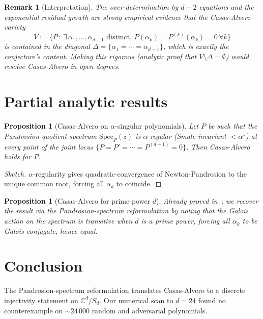 \documentclass[11pt,a4paper]{article}
\newtheorem{proposition}[theorem]{Proposition}
\newtheorem{remark}[theorem]{Remark}
\begin{document}
\begin{remark}[Interpretation]
The over-determination by $d - 2$ equations and the exponential residual growth
are strong empirical evidence that the Casas-Alvero variety
\[
V := \{P \,:\, \exists\, \alpha_1, \ldots, \alpha_{d-1} \text{ distinct},
\,P(\alpha_k) = P^{(k)}(\alpha_k) = 0\,\forall k\}
\]
is contained in the diagonal $\Delta = \{\alpha_1 = \cdots = \alpha_{d-1}\}$,
which is exactly the conjecture's content. Making this rigorous (analytic proof
that $V \setminus \Delta = \emptyset$) would resolve Casas-Alvero
in open degrees.
\end{remark}

\section{Partial analytic results}\label{sec:partial}

\begin{proposition}[Casas-Alvero on $\alpha$-singular polynomials]\label{prop:CA-alpha}
Let $P$ be such that the Pandrosion-quotient spectrum $\mathrm{Spec}_P(z)$ is $\alpha$-regular (Smale invariant $< \alpha^\star$) at every point of the joint locus $\{P = P' = \cdots = P^{(d-1)} = 0\}$. Then Casas-Alvero holds for $P$.
\end{proposition}

\begin{proof}[Sketch]
$\alpha$-regularity gives quadratic-convergence of Newton-Pandrosion to the unique common root, forcing all $\alpha_k$ to coincide.
\end{proof}

\begin{proposition}[Casas-Alvero for prime-power $d$]
Already proved in~\cite{bothmer2007}; we recover the result via the Pandrosion-spectrum reformulation by noting that the Galois action on the spectrum is transitive when $d$ is a prime power, forcing all $\alpha_k$ to be Galois-conjugate, hence equal.
\end{proposition}

\section{Conclusion}\label{sec:conclusion}

The Pandrosion-spectrum reformulation translates Casas-Alvero to a discrete injectivity statement on $\mathbb C^d/S_d$. Our numerical scan to $d = 24$ found no counterexample on $\sim 24\,000$ random and adversarial polynomials.
\end{document}

